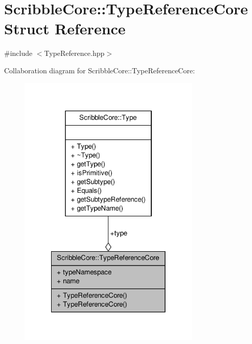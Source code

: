 \hypertarget{struct_scribble_core_1_1_type_reference_core}{\section{Scribble\-Core\-:\-:Type\-Reference\-Core Struct Reference}
\label{struct_scribble_core_1_1_type_reference_core}
}


{\ttfamily \#include $<$Type\-Reference.\-hpp$>$}



Collaboration diagram for Scribble\-Core\-:\-:Type\-Reference\-Core\-:
\nopagebreak
\begin{figure}[H]
\begin{center}
\leavevmode
\includegraphics[width=246pt]{struct_scribble_core_1_1_type_reference_core__coll__graph}
\end{center}
\end{figure}
